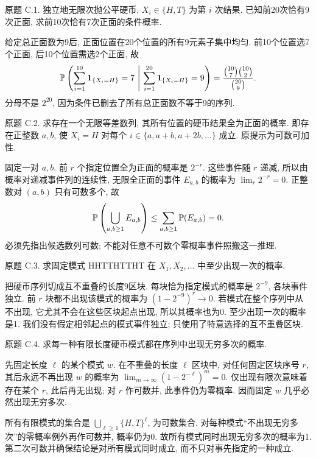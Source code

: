 \begin{exercise}\label{ps3-c1}
原题 C.1. 独立地无限次抛公平硬币, $X_i\in\{H,T\}$ 为第 $i$ 次结果. 已知前20次恰有9次正面, 求前10次恰有7次正面的条件概率.
\end{exercise}
\begin{solution}
给定总正面数为9后, 正面位置在20个位置的所有9元素子集中均匀. 前10个位置选7个正面, 后10个位置需选2个正面, 故
\[
\Prob\left(\sum_{i=1}^{10}\ind_{\{X_i=H\}}=7\ \middle|\ \sum_{i=1}^{20}\ind_{\{X_i=H\}}=9\right)
=\frac{\binom{10}{7}\binom{10}{2}}{\binom{20}{9}}.
\]
分母不是 $2^{20}$, 因为条件已删去了所有总正面数不等于9的序列.
\end{solution}

\begin{exercise}\label{ps3-c2}
原题 C.2. 求存在一个无限等差数列, 其所有位置的硬币结果全为正面的概率. 即存在正整数 $a,b$, 使 $X_i=H$ 对每个 $i\in\{a,a+b,a+2b,\ldots\}$ 成立. 原提示为可数可加性.
\end{exercise}
\begin{solution}
固定一对 $a,b$. 前 $r$ 个指定位置全为正面的概率是 $2^{-r}$. 这些事件随 $r$ 递减, 所以由概率对递减事件列的连续性, 无限全正面的事件 $E_{a,b}$ 的概率为 $\lim_r2^{-r}=0$. 正整数对 $(a,b)$ 只有可数多个, 故
\[
\mathbb P\left(\bigcup_{a,b\ge1}E_{a,b}\right)\le\sum_{a,b\ge1}\mathbb P(E_{a,b})=0.
\]
必须先指出候选数列可数; 不能对任意不可数个零概率事件照搬这一推理.
\end{solution}

\begin{exercise}\label{ps3-c3}
原题 C.3. 求固定模式 HHTTHTTHT 在 $X_1,X_2,\ldots$ 中至少出现一次的概率.
\end{exercise}
\begin{solution}
把硬币序列切成互不重叠的长度9区块. 每块恰为指定模式的概率是 $2^{-9}$, 各块事件独立. 前 $r$ 块都不出现该模式的概率为 $(1-2^{-9})^r\to0$. 若模式在整个序列中从不出现, 它尤其不会在这些区块起点出现, 所以其概率也为0. 至少出现一次的概率是1. 我们没有假定相邻起点的模式事件独立; 只使用了特意选择的互不重叠区块.
\end{solution}

\begin{exercise}\label{ps3-c4}
原题 C.4. 求每一种有限长度硬币模式都在序列中出现无穷多次的概率.
\end{exercise}
\begin{solution}
先固定长度 $\ell$ 的某个模式 $w$. 在不重叠的长度 $\ell$ 区块中, 对任何固定区块序号 $r$, 其后永远不再出现 $w$ 的概率为
$\lim_{m\to\infty}(1-2^{-\ell})^m=0$.
仅出现有限次意味着存在某个 $r$, 此后再无出现; 对 $r$ 作可数并, 此事件仍为零概率. 因而固定 $w$ 几乎必然出现无穷多次.

所有有限模式的集合是 $\bigcup_{\ell\ge1}\{H,T\}^{\ell}$, 为可数集合. 对每种模式“不出现无穷多次”的零概率例外再作可数并, 概率仍为0. 故所有模式同时出现无穷多次的概率为1. 第二次可数并确保结论是对所有模式同时成立, 而不只对事先指定的一种成立.
\end{solution}

